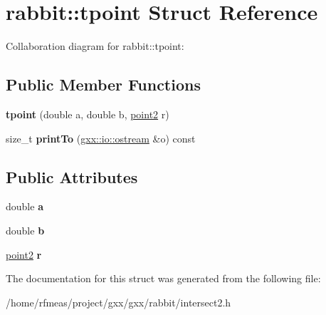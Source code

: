 \hypertarget{structrabbit_1_1tpoint}{}\section{rabbit\+:\+:tpoint Struct Reference}
\label{structrabbit_1_1tpoint}


Collaboration diagram for rabbit\+:\+:tpoint\+:
\subsection*{Public Member Functions}
\begin{DoxyCompactItemize}
\item 
{\bfseries tpoint} (double a, double b, \hyperlink{classmalgo_1_1vector2}{point2} r)\hypertarget{structrabbit_1_1tpoint_acdbc903be31f23b57e4e781da5f88b59}{}\label{structrabbit_1_1tpoint_acdbc903be31f23b57e4e781da5f88b59}

\item 
size\+\_\+t {\bfseries print\+To} (\hyperlink{classgxx_1_1io_1_1ostream}{gxx\+::io\+::ostream} \&o) const \hypertarget{structrabbit_1_1tpoint_ac3da06794e55d99efdc5fb1b0c65ea3a}{}\label{structrabbit_1_1tpoint_ac3da06794e55d99efdc5fb1b0c65ea3a}

\end{DoxyCompactItemize}
\subsection*{Public Attributes}
\begin{DoxyCompactItemize}
\item 
double {\bfseries a}\hypertarget{structrabbit_1_1tpoint_a00f6b27daceede746b6655d8bc0c8dc1}{}\label{structrabbit_1_1tpoint_a00f6b27daceede746b6655d8bc0c8dc1}

\item 
double {\bfseries b}\hypertarget{structrabbit_1_1tpoint_aa94638ff2e1232ba274ae1dde99ddfe3}{}\label{structrabbit_1_1tpoint_aa94638ff2e1232ba274ae1dde99ddfe3}

\item 
\hyperlink{classmalgo_1_1vector2}{point2} {\bfseries r}\hypertarget{structrabbit_1_1tpoint_a6fec707252b9e4e384c42cf30a94ac52}{}\label{structrabbit_1_1tpoint_a6fec707252b9e4e384c42cf30a94ac52}

\end{DoxyCompactItemize}


The documentation for this struct was generated from the following file\+:\begin{DoxyCompactItemize}
\item 
/home/rfmeas/project/gxx/gxx/rabbit/intersect2.\+h\end{DoxyCompactItemize}
